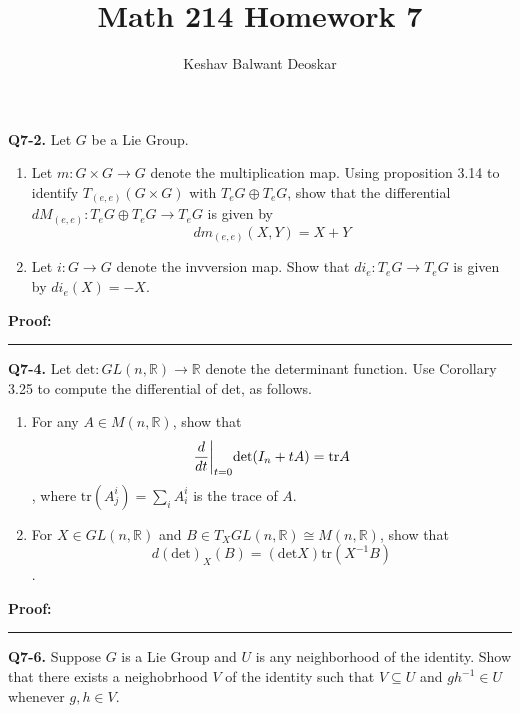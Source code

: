 \documentclass{article}
\title{Math 214 Homework 7}
\author{Keshav Balwant Deoskar}
\newcommand{\R}{\mathbb{R}}
\newcommand{\restr}[2]{{%
  \left.\kern-\nulldelimiterspace %
  #1 %
  \vphantom{\big|} %
  \right|_{#2} %
  }}
\begin{document}
\maketitle


\textbf{Q7-2.} Let $G$ be a Lie Group.
\begin{enumerate}[label=(\alph*)]
  \item Let $m : G \times G \rightarrow G$ denote the multiplication map. Using proposition 3.14 to identify $T_{(e,e)} \left(G \times G\right)$ with $T_{e}G \oplus T_e G$, show that the differential $dM_{(e,e)} : T_e G \oplus T_e G \rightarrow T_e G$ is given by 
  \[ dm_{(e,e)}\left(X, Y\right) = X + Y \]

  \item Let $i : G \rightarrow G$ denote the invversion map. Show that $di_e : T_e G \rightarrow T_e G$ is given by $di_e(X) = -X $.
\end{enumerate}

\vskip 0.5cm
\textbf{Proof:}


\vskip 0.5cm
\hrule 
\vskip 0.5cm


\textbf{Q7-4.} Let $\mathrm{det} : GL(n, \R) \rightarrow \R$ denote the determinant function. Use Corollary 3.25 to compute the differential of det, as follows.
\begin{enumerate}[label=(\alph*)]
  \item For any $A \in M(n, \R)$, show that 
  \[ \restr{\frac{d}{dt}}{t = 0} \mathrm{det}(I_n + tA) = \mathrm{tr}A \], where $\mathrm{tr}\left(A^i_j\right) = \sum_{i} A^i_i$ is the trace of $A$.
  
  \item For $X \in GL(n, \R)$ and $B \in T_X GL(n, \R) \cong M(n,\R)$, show that 
  \[ d\left(\mathrm{det}\right)_X (B) = \left( \mathrm{det} X \right) \mathrm{tr} \left(X^{-1} B\right) \].
\end{enumerate}

\vskip 0.5cm
\textbf{Proof:}


\vskip 0.5cm
\hrule 
\vskip 0.5cm


\textbf{Q7-6.} Suppose $G$ is a Lie Group and $U$ is any neighborhood of the identity. Show that there exists a neighobrhood $V$ of the identity such that $V \subseteq U$ and $g h^{-1} \in U$ whenever $g, h \in V$.
\end{document}
